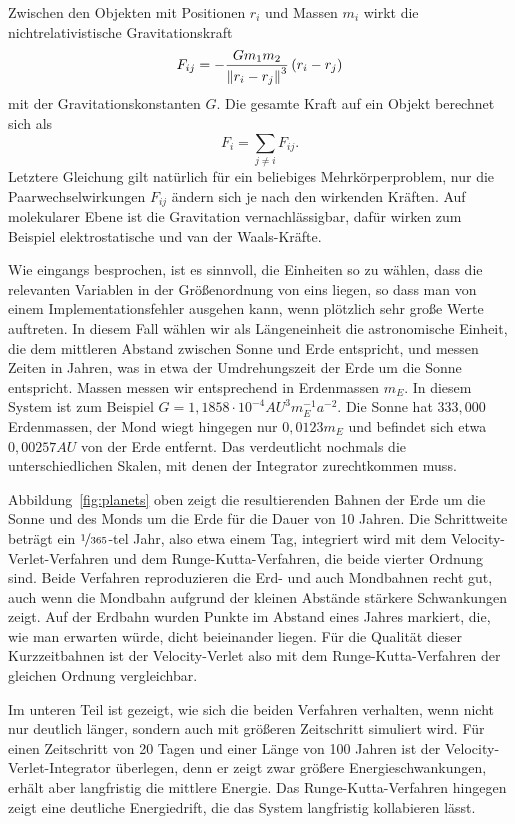 Zwischen den Objekten mit Positionen $r_i$ und Massen $m_i$ wirkt die
nichtrelativistische Gravitationskraft
\begin{equation}
  F_{ij} = -\frac{G m_1 m_2}{\left\lVert{r_i - r_j}\right\rVert^3}\left(r_i - r_j\right)
\end{equation}
mit der Gravitationskonstanten $G$. Die gesamte Kraft auf ein Objekt
berechnet sich als
\begin{equation}
  F_{i} = \sum_{j\neq i} F_{ij}.
\end{equation}
Letztere Gleichung gilt natürlich für ein beliebiges
Mehrkörperproblem, nur die Paarwechselwirkungen $F_{ij}$ ändern sich
je nach den wirkenden Kräften. Auf molekularer Ebene ist die
Gravitation vernachlässigbar, dafür wirken zum Beispiel
elektrostatische und van der Waals-Kräfte.

Wie eingangs besprochen, ist es sinnvoll, die Einheiten so zu wählen,
dass die relevanten Variablen in der Größenordnung von eins liegen, so
dass man von einem Implementationsfehler ausgehen kann, wenn plötzlich
sehr große Werte auftreten. In diesem Fall wählen wir als
Längeneinheit die astronomische Einheit, die dem mittleren Abstand
zwischen Sonne und Erde entspricht, und messen Zeiten in Jahren, was
in etwa der Umdrehungszeit der Erde um die Sonne entspricht. Massen
messen wir entsprechend in Erdenmassen $m_E$. In diesem System ist zum
Beispiel $G=1,1858\cdot 10^{-4} AU^3 m_E^{-1} a^{-2}$. Die Sonne hat
$333,000$ Erdenmassen, der Mond wiegt hingegen nur $0,0123m_E$ und
befindet sich etwa $0,00257AU$ von der Erde entfernt. Das verdeutlicht
nochmals die unterschiedlichen Skalen, mit denen der Integrator
zurechtkommen muss.

Abbildung~\ref{fig:planets} oben zeigt die resultierenden Bahnen der
Erde um die Sonne und des Monds um die Erde für die Dauer von 10
Jahren. Die Schrittweite beträgt ein $\nicefrac{1}{365}$-tel Jahr,
also etwa einem Tag, integriert wird mit dem Velocity-Verlet-Verfahren
und dem Runge-Kutta-Verfahren, die beide vierter Ordnung sind. Beide
Verfahren reproduzieren die Erd- und auch Mondbahnen recht gut, auch
wenn die Mondbahn aufgrund der kleinen Abstände stärkere Schwankungen
zeigt. Auf der Erdbahn wurden Punkte im Abstand eines Jahres markiert,
die, wie man erwarten würde, dicht beieinander liegen. Für die
Qualität dieser Kurzzeitbahnen ist der Velocity-Verlet also mit dem
Runge-Kutta-Verfahren der gleichen Ordnung vergleichbar.

Im unteren Teil ist gezeigt, wie sich die beiden Verfahren verhalten,
wenn nicht nur deutlich länger, sondern auch mit größeren Zeitschritt
simuliert wird. Für einen Zeitschritt von 20 Tagen und einer Länge
von 100 Jahren ist der Velocity-Verlet-Integrator
überlegen, denn er zeigt zwar größere Energieschwankungen, erhält aber
langfristig die mittlere Energie. Das Runge-Kutta-Verfahren hingegen
zeigt eine deutliche Energiedrift, die das System langfristig
kollabieren lässt.

